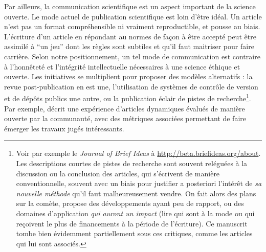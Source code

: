 {Par ailleurs, la communication scientifique est un aspect important de la science ouverte. Le mode actuel de publication scientifique est loin d'être idéal. Un article n'est pas un format compréhensible ni vraiment reproductible, et pousse au biais. L'écriture d'un article en répondant au normes de façon à être accepté peut être assimilé à ``un jeu'' dont les règles sont subtiles et qu'il faut maitriser pour faire carrière. Selon notre positionnement, un tel mode de communication est contraire à l'honnêteté et l'intégrité intellectuelle nécessaires à une science éthique et ouverte. Les initiatives se multiplient pour proposer des modèles alternatifs : la revue post-publication en est une, l'utilisation de systèmes de contrôle de version et de dépôts publics une autre, ou la publication éclair de pistes de recherche\footnote{Voir par exemple le \emph{Journal of Brief Ideas} à \url{http://beta.briefideas.org/about}. Les descriptions courtes de pistes de recherche sont souvent reléguées à la discussion ou la conclusion des articles, qui s'écrivent de manière conventionnelle, souvent avec un biais pour justifier a posteriori l'intérêt de \emph{sa nouvelle méthode} qu'il faut malheureusement vendre. On fait alors des plans sur la comète, propose des développements ayant peu de rapport, ou des domaines d'application \emph{qui auront un impact} (lire qui sont à la mode ou qui reçoivent le plus de financements à la période de l'écriture). Ce manuscrit tombe bien évidemment partiellement sous ces critiques, comme les articles qui lui sont associés.}. Par exemple, \cite{bon2017novel} décrit une expérience d'articles dynamiques évalués de manière ouverte par la communauté, avec des métriques associées permettant de faire émerger les travaux jugés intéressants.
}






